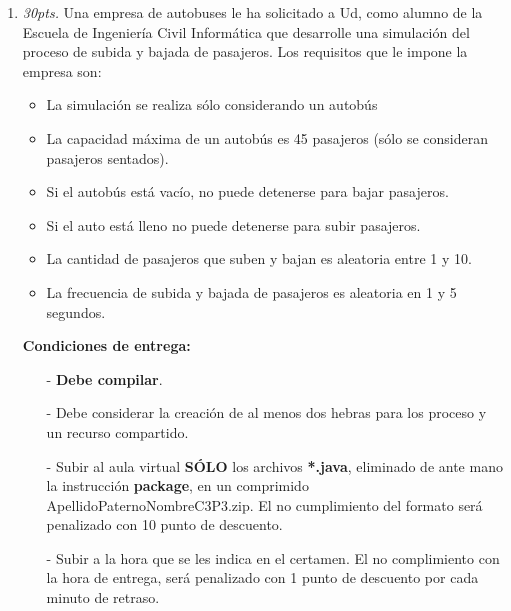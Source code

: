 \documentclass[10pt]{article}
\begin{document}
{\begin{enumerate}
\begin{multicols}{3}
\end{multicols}

\textbf{La aplicaci\'on permite ingresar 3 textos: Identificador de una persona, nombre de una persona y apellido de una persona. Si alguno de estos datos no es ingresado, se despliega un mensaje de error.}

\newpage

\item \emph{30pts.} Una empresa de autobuses le ha solicitado a Ud, como alumno de la Escuela de Ingenier\'ia Civil Inform\'atica que desarrolle una simulaci\'on del proceso de subida y bajada de pasajeros. Los requisitos que le impone la empresa son:

\begin{itemize}
    \item La simulaci\'on se realiza s\'olo considerando un autobús
    \item La capacidad m\'axima de un autob\'us es 45 pasajeros (s\'olo se consideran pasajeros sentados).
    \item Si el autob\'us est\'a vac\'io, no puede detenerse para bajar pasajeros.
    \item Si el auto est\'a lleno no puede detenerse para subir pasajeros.
    \item La cantidad de pasajeros que suben y bajan es aleatoria entre 1 y 10.
    \item La frecuencia de subida y bajada de pasajeros es aleatoria en 1 y 5 segundos. 
\end{itemize}

\textbf{Condiciones de entrega:}
\begin{itemize}
    \item[-] \textbf{Debe compilar}. 
    \item[-] Debe considerar la creaci\'on de al menos dos hebras para los proceso y un recurso compartido. 
    \item[-] Subir al aula virtual \textbf{S\'OLO} los archivos \textbf{*.java}, eliminado de ante mano la instrucci\'on \textbf{package}, en un comprimido ApellidoPaternoNombreC3P3.zip. El no cumplimiento del formato ser\'a penalizado con 10 punto de descuento.
    \item[-] Subir a la hora que se les indica en el certamen. El no complimiento con la hora de entrega, ser\'a penalizado con 1 punto de descuento por cada minuto de retraso.
\end{itemize}

 


\end{enumerate}}
\end{document}
